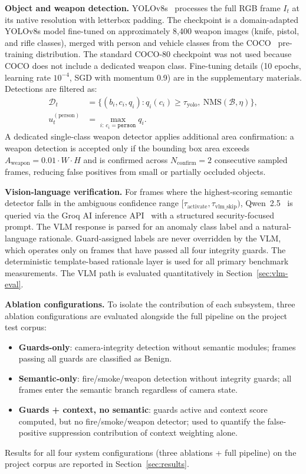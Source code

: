 \documentclass[a4paper,fleqn]{cas-dc}
\begin{document}
\textbf{Object and weapon detection.} YOLOv8s~\citep{aboah2023vision} processes the full RGB frame $I_t$ at its native resolution with letterbox padding. The checkpoint is a domain-adapted YOLOv8s model fine-tuned on approximately 8{,}400 weapon images (knife, pistol, and rifle classes), merged with person and vehicle classes from the COCO~\citep{lin2014microsoft} pre-training distribution. The standard COCO-80 checkpoint was not used because COCO does not include a dedicated weapon class. Fine-tuning details (10 epochs, learning rate $10^{-4}$, SGD with momentum 0.9) are in the supplementary materials. Detections are filtered as:
\begin{equation}
\begin{aligned}
\mathcal{D}_t &= \{(b_i, c_i, q_i) : q_i(c_i) \ge \tau_{\text{yolo}},\ \mathrm{NMS}(\mathcal{B}, \eta)\}, \\
u_t^{(\text{person})} &= \max_{i:\,c_i=\texttt{person}} q_i.
\end{aligned}
\end{equation}
A dedicated single-class weapon detector applies additional area confirmation: a weapon detection is accepted only if the bounding box area exceeds $A_{\text{weapon}} = 0.01 \cdot W \cdot H$ and is confirmed across $N_{\text{confirm}} = 2$ consecutive sampled frames, reducing false positives from small or partially occluded objects.
 
\textbf{Vision-language verification.} For frames where the highest-scoring semantic detector falls in the ambiguous confidence range $[\tau_{\text{activate}}, \tau_{\text{vlm\_skip}})$, Qwen~2.5~\citep{qwen25vl2025} is queried via the Groq AI inference API~\citep{groqapi2025} with a structured security-focused prompt. The VLM response is parsed for an anomaly class label and a natural-language rationale. Guard-assigned labels are never overridden by the VLM, which operates only on frames that have passed all four integrity guards. The deterministic template-based rationale layer is used for all primary benchmark measurements. The VLM path is evaluated quantitatively in Section~\ref{sec:vlm-eval}.
 
\textbf{Ablation configurations.} To isolate the contribution of each subsystem, three ablation configurations are evaluated alongside the full pipeline on the project test corpus:
\begin{itemize}[leftmargin=2em]
\item \textbf{Guards-only}: camera-integrity detection without semantic modules; frames passing all guards are classified as Benign.
\item \textbf{Semantic-only}: fire/smoke/weapon detection without integrity guards; all frames enter the semantic branch regardless of camera state.
\item \textbf{Guards + context, no semantic}: guards active and context score computed, but no fire/smoke/weapon detector; used to quantify the false-positive suppression contribution of context weighting alone.
\end{itemize}
Results for all four system configurations (three ablations + full pipeline) on the project corpus are reported in Section~\ref{sec:results}.
 
\end{document}
